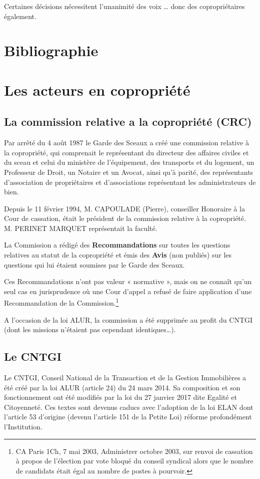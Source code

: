	Certaines décisions nécessitent l’unanimité des voix … donc des copropriétaires également.
	
\section*{Bibliographie}

\section*{Les acteurs en copropriété}

	\subsection*{La commission relative a la copropriété (CRC)}
	Par arrêté du 4 août 1987 le Garde des Sceaux a créé une commission relative à la copropriété, qui comprenait le représentant du directeur des affaires civiles et du sceau et celui du ministère de l'équipement, des transports et du logement, un Professeur de Droit, un Notaire et un Avocat, ainsi qu’à parité, des représentants d’association de propriétaires et d’associations représentant les administrateurs de bien.
	
	Depuis le 11 février 1994, M. CAPOULADE (Pierre), conseiller Honoraire à la Cour de cassation, était le président de la commission relative à la copropriété. M. PERINET MARQUET représentait la faculté.
	
	La Commission a rédigé des \textbf{Recommandations} sur toutes les questions relatives au statut de la copropriété et émis des \textbf{Avis} (non publiés) sur les questions qui lui étaient soumises par le Garde des Sceaux.
	
	Ces Recommandations n’ont pas valeur « normative », mais on ne connaît qu’un seul cas en jurisprudence où une Cour d’appel a refusé de faire application d’une Recommandation de la Commission.\footnote{CA Paris 1\iere Ch, 7 mai 2003, Administrer  octobre 2003, sur renvoi de cassation à propos de l’élection par vote bloqué du conseil syndical alors que le nombre de candidats était égal au nombre de postes à pourvoir.}
	
	A l’occasion de la loi ALUR, la commission a été supprimée au profit du CNTGI (dont les missions n’étaient pas cependant identiques\dots).
	
	\subsection*{Le CNTGI}
	Le CNTGI, Conseil National de la Transaction et de la Gestion Immobilières a été créé par la loi ALUR (article 24) du 24 mars 2014. Sa composition et son fonctionnement ont été modifiés par la loi du 27 janvier 2017 dite Egalité et Citoyenneté. Ces textes sont devenus caducs avec l’adoption de la loi ELAN dont l’article 53 d’origine (devenu l’article 151 de la Petite Loi) réforme profondément l’Institution.
	
